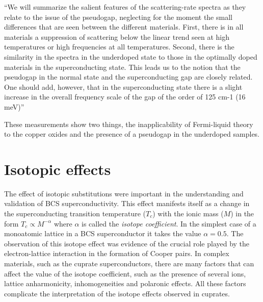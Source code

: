 ``We will summarize the salient features of the scattering-rate spectra as they relate to the issue of the pseudogap, neglecting for the moment the small differences that are seen between the different materials. 
First, there is in all materials a suppression of scattering below the linear trend seen at high temperatures or high frequencies at all temperatures. 
Second, there is the similarity in the spectra in the underdoped state to those in the optimally doped materials in the superconducting state. 
This leads us to the notion that the pseudogap in the normal state and the superconducting gap are closely related. 
One should add, however, that in the superconducting state there is a slight increase in the overall frequency scale of the gap of the order of 125 cm-1 (16 meV)'' \cite{Timusk1999}

These measurements show two things, the inapplicability of Fermi-liquid theory to the copper oxides and the presence of a pseudogap in the underdoped samples.

\section{Isotopic effects}
\label{sec:isotopic_effects}

The effect of isotopic substitutions were important in the understanding and validation of BCS superconductivity.
This effect manifests itself as a change in the superconducting transition temperature ($T_c$) with the ionic mass ($M$) in the form $T_c \propto M^{-\alpha}$ where $\alpha$ is called the \textit{isotope coefficient}.
In the simplest case of a monoatomic lattice in a BCS superconductor it takes the value $\alpha=0.5$.
The observation of this isotope effect \cite{Reynolds1950,Maxwell1950} was evidence of the crucial role played by the electron-lattice interaction in the formation of Cooper pairs. 
In complex materials, such as the cuprate superconductors, there are many factors that can affect the value of the isotope coefficient, such as the presence of several ions, lattice anharmonicity, inhomogeneities and polaronic effects.
All these factors complicate the interpretation of the isotope effects observed in cuprates.

